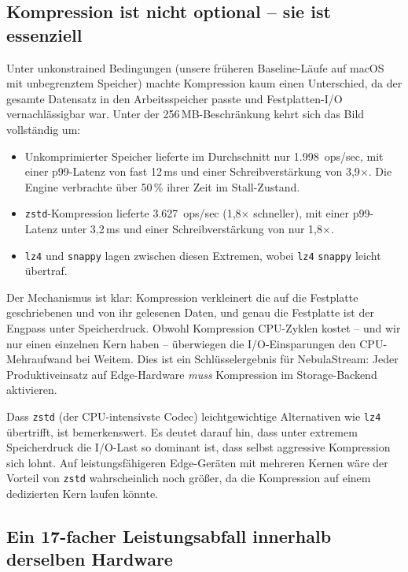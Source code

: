 \documentclass[11pt,a4paper]{scrartcl}
\begin{document}
\subsection{Kompression ist nicht optional -- sie ist essenziell}

Unter unkonstrained Bedingungen (unsere früheren Baseline-Läufe auf macOS mit
unbegrenztem Speicher) machte Kompression kaum einen Unterschied, da der
gesamte Datensatz in den Arbeitsspeicher passte und Festplatten-I/O
vernachlässigbar war. Unter der 256\,MB-Beschränkung kehrt sich das Bild
vollständig um:

\begin{itemize}
  \item Unkomprimierter Speicher lieferte im Durchschnitt nur
        1.998~ops/sec, mit einer p99-Latenz von fast 12\,ms und einer
        Schreibverstärkung von 3,9$\times$. Die Engine verbrachte über 50\,\%
        ihrer Zeit im Stall-Zustand.
  \item \texttt{zstd}-Kompression lieferte 3.627~ops/sec
        (1,8$\times$ schneller), mit einer p99-Latenz unter 3,2\,ms und einer
        Schreibverstärkung von nur 1,8$\times$.
  \item \texttt{lz4} und \texttt{snappy} lagen zwischen diesen Extremen,
        wobei \texttt{lz4} \texttt{snappy} leicht übertraf.
\end{itemize}

Der Mechanismus ist klar: Kompression verkleinert die auf die Festplatte
geschriebenen und von ihr gelesenen Daten, und genau die Festplatte ist der
Engpass unter Speicherdruck. Obwohl Kompression CPU-Zyklen kostet -- und wir
nur einen einzelnen Kern haben -- überwiegen die I/O-Einsparungen den
CPU-Mehraufwand bei Weitem. Dies ist ein Schlüsselergebnis für NebulaStream:
Jeder Produktiveinsatz auf Edge-Hardware \emph{muss} Kompression im
Storage-Backend aktivieren.

Dass \texttt{zstd} (der CPU-intensivste Codec) leichtgewichtige Alternativen
wie \texttt{lz4} übertrifft, ist bemerkenswert. Es deutet darauf hin, dass
unter extremem Speicherdruck die I/O-Last so dominant ist, dass selbst
aggressive Kompression sich lohnt. Auf leistungsfähigeren Edge-Geräten mit
mehreren Kernen wäre der Vorteil von \texttt{zstd} wahrscheinlich noch größer,
da die Kompression auf einem dedizierten Kern laufen könnte.

\subsection{Ein 17-facher Leistungsabfall innerhalb derselben Hardware}
\end{document}
